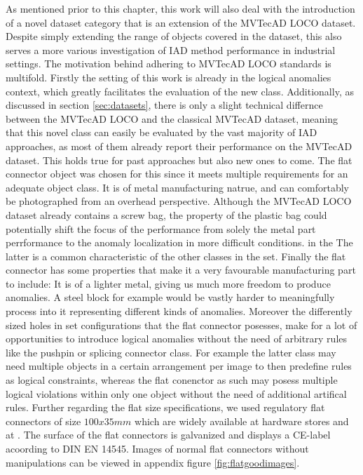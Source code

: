 As mentioned prior to this chapter, this work will also deal with the introduction of a novel dataset category that is an extension of the MVTecAD LOCO \cite{LOCODentsAndScratchesBergmann2022} dataset. 
Despite simply extending the range of objects covered in the dataset, this also serves a more various investigation of IAD method performance in industrial settings. The motivation behind adhering 
to MVTecAD LOCO standards is multifold. Firstly the setting of this work is already in the logical anomalies context, which greatly facilitates the evaluation of the new class. Additionally, as 
discussed in section \ref{sec:datasets}, there is only a slight technical differnce between the MVTecAD LOCO and the classical MVTecAD \cite{MVTEC_Bergmann_2021} dataset, meaning that this novel 
class can easily be evaluated by the vast majority of IAD approaches, as most of them already report their performance on the MVTecAD dataset. This holds true for past approaches but also new ones 
to come.
\newline\newline
The flat connector object was chosen for this since it meets multiple requirements for an adequate object class. It is of metal manufacturing natrue, and can comfortably be photographed from 
an overhead perspective. Although the MVTecAD LOCO dataset already contains a screw bag, the property of the plastic bag could potentially shift the focus of the performance from solely the metal 
part perrformance to the anomaly localization in more difficult conditions. in the The latter is a common characteristic of the other classes in the set. Finally the flat connector has some 
properties that make it a very favourable manufacturing part to include: It is of a lighter metal, giving us much more freedom to produce anomalies. A steel block for example would be vastly 
harder to meaningfully process into it representing different kinds of anomalies. Moreover the differently sized holes in set configurations that the flat connector posesses, make for a lot of opportunities 
to introduce logical anomalies without the need of arbitrary rules like the pushpin or splicing connector class. For example the latter class may need multiple objects in a certain arrangement per image to then predefine 
rules as logical constraints, whereas the flat conenctor as such may posess multiple logical violations within only one object without the need of additional artifical rules.
\newline
Further regarding the flat size specifications, we used regulatory flat 
connectors of size $100x35 mm$ which are widely available at hardware stores and at \cite{flatconnectorlink}. The surface of the flat connectors is galvanized 
and displays a CE-label acoording to DIN EN 14545. Images of normal flat connectors without manipulations can be viewed in appendix figure \ref{fig:flatgoodimages}.


